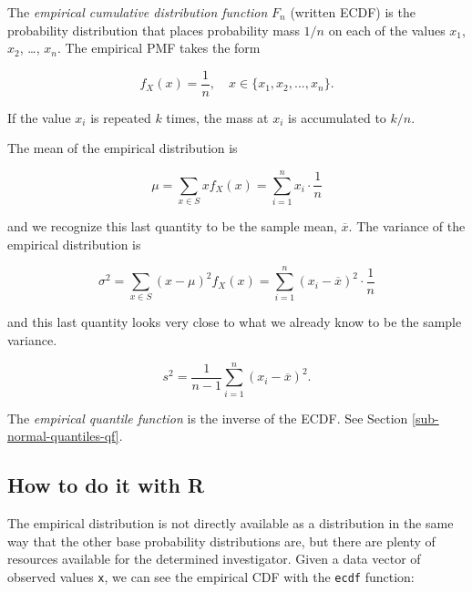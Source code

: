 \documentclass[]{book}
\numberwithin{equation}{chapter}
\numberwithin{figure}{chapter}
\theoremstyle{plain}
\theoremstyle{definition}
\theoremstyle{remark}
\theoremstyle{definition}
\theoremstyle{definition}
\theoremstyle{remark}
\let\BeginKnitrBlock\begin \let\EndKnitrBlock\end
\begin{document}
\bigskip

\BeginKnitrBlock{definition}
\protect\hypertarget{def:unnamed-chunk-223}{}{\label{def:unnamed-chunk-223}}The
\emph{empirical cumulative distribution function} \(F_{n}\) (written
ECDF)  is the probability distribution
that places probability mass \(1/n\) on each of the values \(x_{1}\),
\(x_{2}\), \ldots{}, \(x_{n}\). The empirical PMF takes the form

\begin{equation} 
f_{X}(x)=\frac{1}{n},\quad x\in \{ x_{1},x_{2},...,x_{n} \}.
\end{equation}

If the value \(x_{i}\) is repeated \(k\) times, the mass at \(x_{i}\) is
accumulated to \(k/n\).
\EndKnitrBlock{definition}

The mean of the empirical distribution is

\begin{equation}
\mu=\sum_{x\in S}xf_{X}(x)=\sum_{i=1}^{n}x_{i}\cdot\frac{1}{n}
\end{equation}

and we recognize this last quantity to be the sample mean,
\(\overline{x}\). The variance of the empirical distribution is

\begin{equation}
\sigma^{2}=\sum_{x\in S}(x-\mu)^{2}f_{X}(x)=\sum_{i=1}^{n}(x_{i}-\overline{x})^{2}\cdot\frac{1}{n}
\end{equation}

and this last quantity looks very close to what we already know to be
the sample variance.

\begin{equation}
s^{2}=\frac{1}{n-1}\sum_{i=1}^{n}(x_{i}-\overline{x})^{2}.
\end{equation}

The \emph{empirical quantile function} is the inverse of the ECDF. See
Section \ref{sub-normal-quantiles-qf}.

\subsection{How to do it with R}\label{how-to-do-it-with-r-23}

The empirical distribution is not directly available as a distribution
in the same way that the other base probability distributions are, but
there are plenty of resources available for the determined investigator.
Given a data vector of observed values \texttt{x}, we can see the
empirical CDF with the \texttt{ecdf} 
function:
\end{document}

